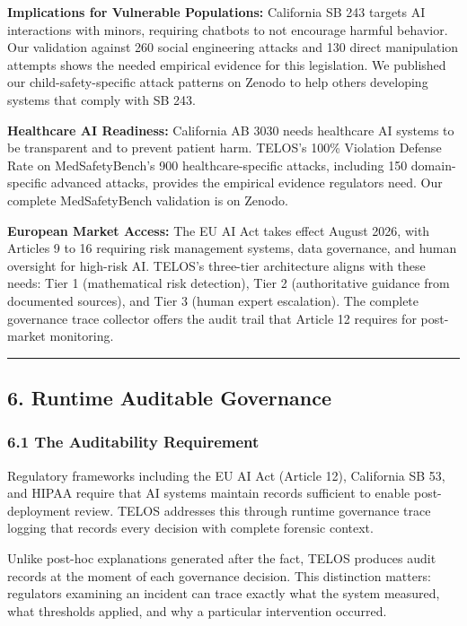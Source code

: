 \textbf{Implications for Vulnerable Populations:} California SB 243
targets AI interactions with minors, requiring chatbots to not encourage
harmful behavior. Our validation against 260 social engineering attacks
and 130 direct manipulation attempts shows the needed empirical evidence
for this legislation. We published our child-safety-specific attack
patterns on Zenodo to help others developing systems that comply with SB
243.

\textbf{Healthcare AI Readiness:} California AB 3030 needs healthcare AI
systems to be transparent and to prevent patient harm. TELOS's 100\%
Violation Defense Rate on MedSafetyBench's 900 healthcare-specific
attacks, including 150 domain-specific advanced attacks, provides the
empirical evidence regulators need. Our complete MedSafetyBench
validation is on Zenodo.

\textbf{European Market Access:} The EU AI Act takes effect August 2026,
with Articles 9 to 16 requiring risk management systems, data
governance, and human oversight for high-risk AI. TELOS's three-tier
architecture aligns with these needs: Tier 1 (mathematical risk
detection), Tier 2 (authoritative guidance from documented sources), and
Tier 3 (human expert escalation). The complete governance trace
collector offers the audit trail that Article 12 requires for
post-market monitoring.

\begin{center}\rule{0.5\linewidth}{0.5pt}\end{center}

\subsection{6. Runtime Auditable
Governance}\label{runtime-auditable-governance}

\subsubsection{6.1 The Auditability
Requirement}\label{the-auditability-requirement}

Regulatory frameworks including the EU AI Act (Article 12), California
SB 53, and HIPAA require that AI systems maintain records sufficient to
enable post-deployment review. TELOS addresses this through runtime
governance trace logging that records every decision with complete
forensic context.

Unlike post-hoc explanations generated after the fact, TELOS produces
audit records at the moment of each governance decision. This
distinction matters: regulators examining an incident can trace exactly
what the system measured, what thresholds applied, and why a particular
intervention occurred.

